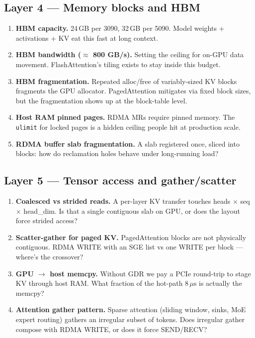 \documentclass[11pt]{article}
\begin{document}
\subsection*{Layer 4 --- Memory blocks and HBM}
\begin{enumerate}[resume]
\item \textbf{HBM capacity.} 24\,GB per 3090, 32\,GB per 5090.
Model weights + activations + KV eat this fast at long context.
\item \textbf{HBM bandwidth ($\approx$ 800 GB/s).} Setting the
ceiling for on-GPU data movement. FlashAttention's tiling exists to
stay inside this budget.
\item \textbf{HBM fragmentation.} Repeated alloc/free of
variably-sized KV blocks fragments the GPU allocator. PagedAttention
mitigates via fixed block sizes, but the fragmentation shows up at
the block-table level.
\item \textbf{Host RAM pinned pages.} RDMA MRs require pinned
memory. The \texttt{ulimit} for locked pages is a hidden ceiling
people hit at production scale.
\item \textbf{RDMA buffer slab fragmentation.} A slab registered
once, sliced into blocks: how do reclamation holes behave under
long-running load?
\end{enumerate}

\subsection*{Layer 5 --- Tensor access and gather/scatter}
\begin{enumerate}[resume]
\item \textbf{Coalesced vs strided reads.} A per-layer KV transfer
touches heads $\times$ seq $\times$ head\_dim. Is that a single
contiguous slab on GPU, or does the layout force strided access?
\item \textbf{Scatter-gather for paged KV.} PagedAttention blocks
are not physically contiguous. RDMA WRITE with an SGE list vs one
WRITE per block --- where's the crossover?
\item \textbf{GPU $\rightarrow$ host memcpy.} Without GDR we pay a
PCIe round-trip to stage KV through host RAM. What fraction of the
hot-path 8\,$\mu$s is actually the memcpy?
\item \textbf{Attention gather pattern.} Sparse attention (sliding
window, sinks, MoE expert routing) gathers an irregular subset of
tokens. Does irregular gather compose with RDMA WRITE, or does it
force SEND/RECV?
\end{enumerate}
\end{document}
